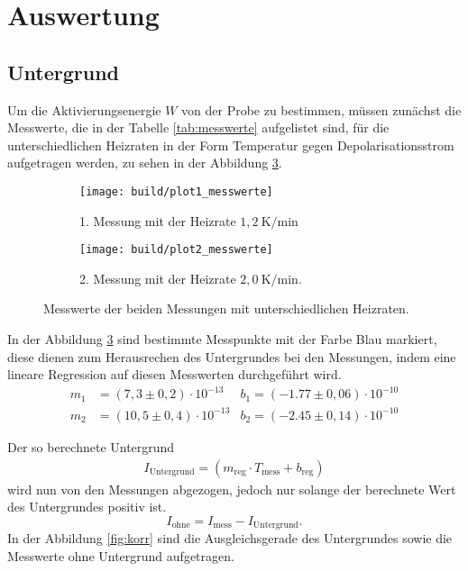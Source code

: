 \section{Auswertung}
\label{sec:Auswertung}

\subsection{Untergrund}
\label{sec:Untergrund}

Um die Aktivierungsenergie $W$ von der Probe zu bestimmen,
müssen zunächst die Messwerte, die in der Tabelle \ref{tab:messwerte} aufgelistet sind,
für die unterschiedlichen Heizraten in der Form
Temperatur gegen Depolarisationsstrom aufgetragen werden, zu sehen
in der Abbildung \ref{fig:mess}.



\begin{figure}
  \centering
  \begin{subfigure}{0.49\textwidth}
    \centering
    \texttt{[image: build/plot1\_messwerte]}
    \caption{1. Messung mit der Heizrate $1,2 \ \si{\kelvin\per\minute}$}
    \label{fig:mess1}
  \end{subfigure}
  \begin{subfigure}{0.49\textwidth}
    \centering
    \texttt{[image: build/plot2\_messwerte]}
    \caption{2. Messung mit der Heizrate $2,0 \ \si{\kelvin\per\minute}$.}
    \label{fig:mess2}
  \end{subfigure}
\caption{Messwerte der beiden Messungen mit unterschiedlichen Heizraten.}
\label{fig:mess}
\end{figure}


In der Abbildung \ref{fig:mess} sind bestimmte
Messpunkte mit der Farbe Blau
markiert, diese dienen zum Herausrechen des Untergrundes
bei den Messungen, indem eine lineare Regression auf diesen Messwerten
durchgeführt wird.
\begin{align*}
m_1&= (7,3\pm0,2)\cdot10^{-13}      &b_1 =(-1.77\pm0,06)\cdot10^{-10} \\
m_2&=(10,5\pm0,4)\cdot10^{-13}      &b_2 =(-2.45\pm0,14)\cdot10^{-10}
\end{align*}

Der so berechnete Untergrund
\begin{align*}
  I_\mathrm{Untergrund}=(m_\mathrm{reg}\cdot T_\mathrm{mess}+b_\mathrm{reg})
\end{align*}
wird nun von den Messungen
abgezogen, jedoch nur solange der berechnete Wert
des Untergrundes positiv ist.
\begin{equation}
 I_{\mathrm{ohne}}=I_{\mathrm{mess}}-I_\mathrm{Untergrund}.\label{eqn:Untergrund}
\end{equation}
In der Abbildung \ref{fig:korr} sind die Ausgleichsgerade des Untergrundes
sowie die Messwerte ohne Untergrund aufgetragen.

